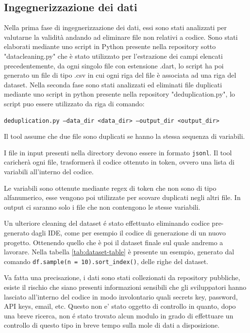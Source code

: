 \subsection{Ingegnerizzazione dei dati}
Nella prima fase di ingegnerizzazione dei dati, essi sono stati analizzati per valutarne la validità andando ad eliminare file non relativi a codice.
Sono stati elaborati mediante uno script in Python presente nella repository sotto "datacleaning.py" che è stato utilizzato per l'estrazione dei campi elencati precedentemente, da ogni singolo file con estensione .dart, lo script ha poi generato un file di tipo .csv in cui ogni riga del file è associata ad una riga del dataset.
Nella seconda fase sono stati analizzati ed eliminati file duplicati mediante uno script in python presente nella repository "deduplication.py", lo script puo essere utilizzato da riga di comando:
\begin{center}
\texttt{deduplication.py --data\_dir <data\_dir> --output\_dir <output\_dir>}
\end{center}
Il tool assume che due file sono duplicati se hanno la stessa sequenza di variabili.

I file in input presenti nella directory devono essere in formato \texttt{jsonl}. Il tool caricherà ogni file, trasformerà il codice ottenuto in token, ovvero una lista di variabili all'interno del codice. 

Le variabili sono ottenute mediante regex di token che non sono di tipo alfanumerico, esse vengono poi utilizzate per scovare duplicati negli altri file. In output ci saranno solo i file che non contengono le stesse variabili.

Un ulteriore cleaning del dataset é stato effettuato eliminando codice pre-generato dagli IDE, come per esempio il codice di generazione di un nuovo progetto. Ottenendo quello che è poi il dataset finale sul quale andremo a lavorare. Nella tabella \ref{tab:dataset-table} è presente un esempio, generato dal comando \texttt{df.sample(n = 10).sort\_index()},  delle righe del dataset.

Va fatta una precisazione, i dati sono stati collezionati da repository pubbliche, esiste il rischio che siano presenti informazioni sensibili che gli sviluppatori hanno lasciato all'interno del codice in modo involontario quali secrets key, password, API keys, email, etc. Questo non e' stato oggetto di controllo in quanto, dopo una breve ricerca, non é stato trovato alcun modulo in grado di effettuare un controllo di questo tipo in breve tempo sulla mole di dati a disposizione.

